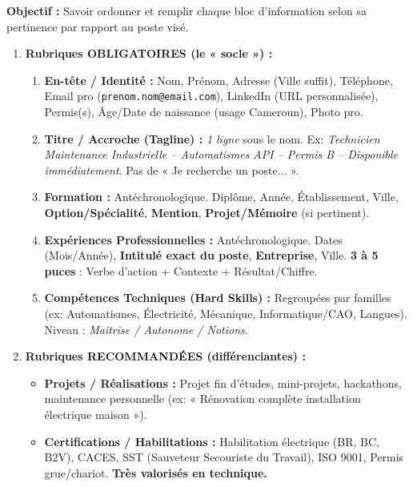 \documentclass[11pt]{article}
\newcommand{\cle}[1]{{\popxbold\color{popdark}#1}}
\begin{document}
\begin{methode}
    \textbf{Objectif :} Savoir ordonner et remplir chaque bloc d'information selon sa pertinence par rapport au poste visé.
    \begin{enumerate}
        \item \textbf{Rubriques OBLIGATOIRES (le « socle ») :}
              \begin{enumerate}
                  \item \textbf{En-tête / Identité :} Nom, Prénom, Adresse (Ville suffit), Téléphone, Email pro (\texttt{prenom.nom@email.com}), LinkedIn (URL personnalisée), Permis(s), Âge/Date de naissance (usage Cameroun), Photo pro.
                  \item \textbf{Titre / Accroche (Tagline) :} \emph{1 ligne} sous le nom. Ex: \textit{Technicien Maintenance Industrielle -- Automatismes API -- Permis B -- Disponible immédiatement}. Pas de « Je recherche un poste... ».
                  \item \textbf{Formation :} Antéchronologique. Diplôme, Année, Établissement, Ville, \textbf{Option/Spécialité}, \textbf{Mention}, \textbf{Projet/Mémoire} (si pertinent).
                  \item \textbf{Expériences Professionnelles :} Antéchronologique. Dates (Mois/Année), \textbf{Intitulé exact du poste}, \textbf{Entreprise}, Ville. \textbf{3 à 5 puces} : Verbe d'action + Contexte + Résultat/Chiffre.
                  \item \textbf{Compétences Techniques (Hard Skills) :} Regroupées par familles (ex: Automatismes, Électricité, Mécanique, Informatique/CAO, Langues). Niveau : \emph{Maîtrise / Autonome / Notions}.
              \end{enumerate}
        \item \textbf{Rubriques RECOMMANDÉES (différenciantes) :}
              \begin{itemize}
                  \item \textbf{Projets / Réalisations :} Projet fin d'études, mini-projets, hackathons, maintenance personnelle (ex: « Rénovation complète installation électrique maison »).
                  \item \textbf{Certifications / Habilitations :} \cle{Habilitation électrique (BR, BC, B2V)}, CACES, SST (Sauveteur Secouriste du Travail), ISO 9001, Permis grue/chariot. \textbf{Très valorisés en technique.}
              \end{itemize}

\end{enumerate}
\end{methode}
\end{document}
